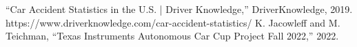 \documentclass[conference]{IEEEtran}
\begin{document}
\begin{thebibliography}{00}
 “Car Accident Statistics in the U.S. | Driver Knowledge,” DriverKnowledge, 2019. https://www.driverknowledge.com/car-accident-statistics/
 K. Jacowleff and M. Teichman, “Texas Instruments Autonomous Car Cup Project Fall 2022,” 2022.
\end{thebibliography}
\end{document}
